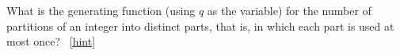 \documentclass{book}
\begin{document}
\setcounter{project}{322}
\addtocounter{project}{-1}
\begin{activity}[]\label{activity-315}
\hypertarget{p-1650}{}%
What is the generating function (using \(q\) as the variable) for the number of partitions of an integer into distinct parts, that is, in which each part is used at most once?%
~\hfill{\tiny\hyperlink{a-322}{[hint]}\hypertarget{q-322}{}}\end{activity}
\end{document}
